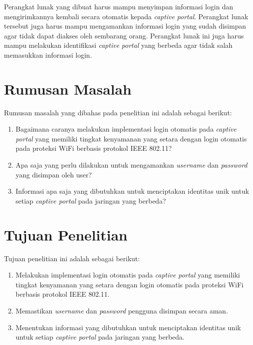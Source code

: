 Perangkat lunak yang dibuat harus mampu menyimpan informasi login dan mengirimkannya kembali secara otomatis kepada \textit{captive portal}. Perangkat lunak tersebut juga harus mampu mengamankan informasi login yang sudah disimpan agar tidak dapat diakses oleh sembarang orang. Perangkat lunak ini juga harus mampu melakukan identifikasi \textit{captive portal} yang berbeda agar tidak salah memasukkan informasi login.



\section{Rumusan Masalah}
\label{sec:rumusan_masalah}

Rumusan masalah yang dibahas pada penelitian ini adalah sebagai berikut:

\begin{enumerate}
	\item{Bagaimana caranya melakukan implementasi login otomatis pada \textit{captive portal} yang memiliki tingkat kenyamanan yang setara dengan login otomatis pada proteksi WiFi berbasis protokol IEEE 802.11?}
	\item{Apa saja yang perlu dilakukan untuk mengamankan \textit{username} dan \textit{password} yang disimpan oleh user?}
	\item{Informasi apa saja yang dibutuhkan untuk menciptakan identitas unik untuk setiap \textit{captive portal} pada jaringan yang berbeda?}
\end{enumerate}



\section{Tujuan Penelitian}
\label{sec:tujuan_penelitian}

Tujuan penelitian ini adalah sebagai berikut:

\begin{enumerate}
	\item{Melakukan implementasi login otomatis pada \textit{captive portal} yang memiliki tingkat kenyamanan yang setara dengan login otomatis pada proteksi WiFi berbasis protokol IEEE 802.11.}
	\item{Memastikan \textit{username} dan \textit{password} pengguna disimpan secara aman.}
	\item{Menentukan informasi yang dibutuhkan untuk menciptakan identitas unik untuk setiap \textit{captive portal} pada jaringan yang berbeda.}
\end{enumerate}



